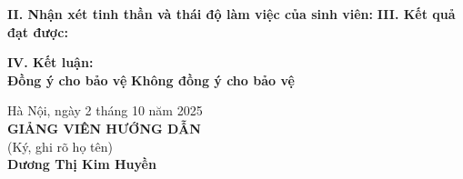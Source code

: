 \vspace{0.3cm}
\noindent\textbf{II. Nhận xét tinh thần và thái độ làm việc của sinh viên:}
\vspace{0.3cm}
\noindent\textbf{III. Kết quả đạt được:}

\vspace{0.3cm}
\noindent\textbf{IV. Kết luận:}\\[0.2cm]
 \textbf{Đồng ý cho bảo vệ} \hspace{2.5cm}  \textbf{Không đồng ý cho bảo vệ}

\vspace{0.3cm}
\noindent
\begin{minipage}[t]{0.48\textwidth}
\end{minipage}
\hfill
\begin{minipage}[t]{0.48\textwidth}
    \begin{center}
        Hà Nội, ngày 2 tháng 10 năm 2025\\[0.2cm]
        \textbf{GIẢNG VIÊN HƯỚNG DẪN}\\[0.2cm]
        (Ký, ghi rõ họ tên)\\[1.2cm]
        \textbf{Dương Thị Kim Huyền}
    \end{center}
\end{minipage}
